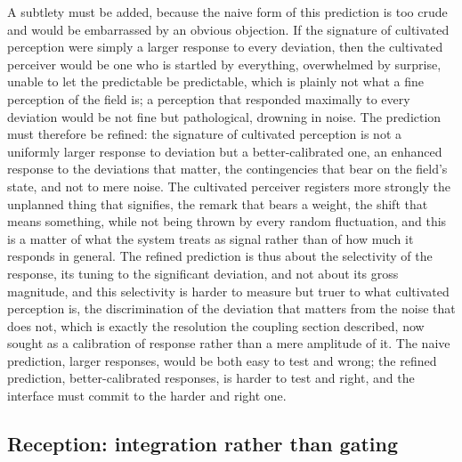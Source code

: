 A subtlety must be added, because the naive form of this prediction is too crude and would be embarrassed by an obvious objection. If the signature of cultivated perception were simply a larger response to every deviation, then the cultivated perceiver would be one who is startled by everything, overwhelmed by surprise, unable to let the predictable be predictable, which is plainly not what a fine perception of the field is; a perception that responded maximally to every deviation would be not fine but pathological, drowning in noise. The prediction must therefore be refined: the signature of cultivated perception is not a uniformly larger response to deviation but a better-calibrated one, an enhanced response to the deviations that matter, the contingencies that bear on the field's state, and not to mere noise. The cultivated perceiver registers more strongly the unplanned thing that signifies, the remark that bears a weight, the shift that means something, while not being thrown by every random fluctuation, and this is a matter of what the system treats as signal rather than of how much it responds in general. The refined prediction is thus about the selectivity of the response, its tuning to the significant deviation, and not about its gross magnitude, and this selectivity is harder to measure but truer to what cultivated perception is, the discrimination of the deviation that matters from the noise that does not, which is exactly the resolution the coupling section described, now sought as a calibration of response rather than a mere amplitude of it. The naive prediction, larger responses, would be both easy to test and wrong; the refined prediction, better-calibrated responses, is harder to test and right, and the interface must commit to the harder and right one.

\subsection{Reception: integration rather than gating}
\label{p22:sub:neuro-reception}

